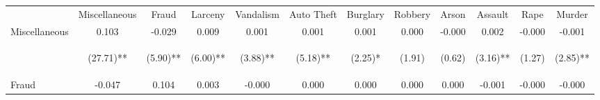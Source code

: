 \begin{tabular}{lccccccccccc}
\hline\hline \noalign{\smallskip} & Miscellaneous & Fraud & Larceny & Vandalism & Auto Theft & Burglary & Robbery & Arson & Assault & Rape & Murder\\
\noalign{\smallskip}\hline \noalign{\smallskip}Miscellaneous & 0.103 & -0.029 & 0.009 & 0.001 & 0.001 & 0.001 & 0.000 & -0.000 & 0.002 & -0.000 & -0.001\\
 & \begin{footnotesize}(27.71)**\end{footnotesize} & \begin{footnotesize}(5.90)**\end{footnotesize} & \begin{footnotesize}(6.00)**\end{footnotesize} & \begin{footnotesize}(3.88)**\end{footnotesize} & \begin{footnotesize}(5.18)**\end{footnotesize} & \begin{footnotesize}(2.25)*\end{footnotesize} & \begin{footnotesize}(1.91)\end{footnotesize} & \begin{footnotesize}(0.62)\end{footnotesize} & \begin{footnotesize}(3.16)**\end{footnotesize} & \begin{footnotesize}(1.27)\end{footnotesize} & \begin{footnotesize}(2.85)**\end{footnotesize}\\
\noalign{\smallskip}Fraud & -0.047 & 0.104 & 0.003 & -0.000 & 0.000 & 0.000 & 0.000 & 0.000 & -0.001 & -0.000 & -0.000\\

\end{tabular}
